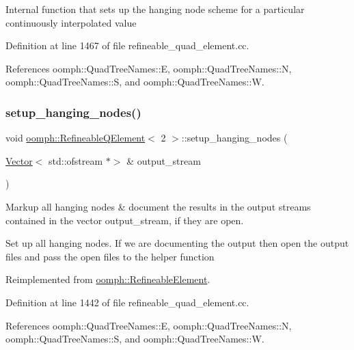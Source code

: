 Internal function that sets up the hanging node scheme for a particular continuously interpolated value 

Definition at line 1467 of file refineable\+\_\+quad\+\_\+element.\+cc.



References oomph\+::\+Quad\+Tree\+Names\+::E, oomph\+::\+Quad\+Tree\+Names\+::N, oomph\+::\+Quad\+Tree\+Names\+::S, and oomph\+::\+Quad\+Tree\+Names\+::W.

\mbox{\label{classoomph_1_1RefineableQElement_3_012_01_4_a2f682eed221473eb97ff70e999fdad65}} 
\subsubsection{\texorpdfstring{setup\+\_\+hanging\+\_\+nodes()}{setup\_hanging\_nodes()}}
{\footnotesize\ttfamily void \hyperlink{classoomph_1_1RefineableQElement}{oomph\+::\+Refineable\+Q\+Element}$<$ 2 $>$\+::setup\+\_\+hanging\+\_\+nodes (\begin{DoxyParamCaption}\item[{\hyperlink{classoomph_1_1Vector}{Vector}$<$ std\+::ofstream $\ast$$>$ \&}]{output\+\_\+stream }\end{DoxyParamCaption})\hspace{0.3cm}{\ttfamily [virtual]}}



Markup all hanging nodes \& document the results in the output streams contained in the vector output\+\_\+stream, if they are open. 

Set up all hanging nodes. If we are documenting the output then open the output files and pass the open files to the helper function 

Reimplemented from \hyperlink{classoomph_1_1RefineableElement_a9368e9ffa7d06a436253d0e23f874d65}{oomph\+::\+Refineable\+Element}.



Definition at line 1442 of file refineable\+\_\+quad\+\_\+element.\+cc.



References oomph\+::\+Quad\+Tree\+Names\+::E, oomph\+::\+Quad\+Tree\+Names\+::N, oomph\+::\+Quad\+Tree\+Names\+::S, and oomph\+::\+Quad\+Tree\+Names\+::W.



